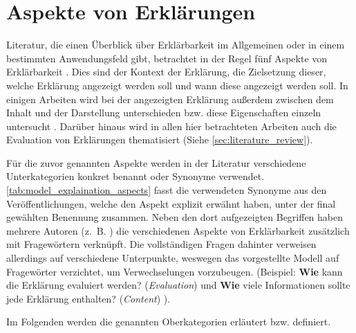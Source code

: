 \section{Aspekte von Erklärungen}
\label{sec:model_explanation_aspects}

Literatur, die einen Überblick über Erklärbarkeit im Allgemeinen oder in einem bestimmten Anwendungsfeld gibt, betrachtet in der Regel fünf Aspekte von Erklärbarkeit \cite{rosenfeld_explainability_2019, nunes_systematic_2017,chazette_knowledge_nodate}. Dies sind der Kontext der Erklärung, die Zielsetzung dieser, welche Erklärung angezeigt werden soll und wann diese angezeigt werden soll. In einigen Arbeiten wird bei der angezeigten Erklärung außerdem zwischen dem Inhalt und der Darstellung unterschieden bzw. diese Eigenschaften einzeln untersucht \cite{nunes_systematic_2017,abdulrahman_belief-based_2019}. Darüber hinaus wird in allen hier betrachteten Arbeiten auch die Evaluation von Erklärungen thematisiert (Siehe \autoref{sec:literature_review}).

Für die zuvor genannten Aspekte werden in der Literatur verschiedene Unterkategorien konkret benannt oder Synonyme verwendet. \autoref{tab:model_explaination_aspects} fasst die verwendeten Synonyme aus den Veröffentlichungen, welche den Aspekt explizit erwähnt haben, unter der final gewählten Benennung zusammen. Neben den dort aufgezeigten Begriffen haben mehrere Autoren (z.~B. \cite{rosenfeld_explainability_2019, chazette2020explainability}) die verschiedenen Aspekte von Erklärbarkeit zusätzlich mit Fragewörtern verknüpft. Die vollständigen Fragen dahinter verweisen allerdings auf verschiedene Unterpunkte, weswegen das vorgestellte Modell auf Fragewörter verzichtet, um Verwechselungen vorzubeugen. (Beispiel: \glqq \textbf{Wie} kann die Erklärung evaluiert werden?\grqq{} (\textit{Evaluation}) \cite[vgl.][]{rosenfeld_explainability_2019} und \glqq \textbf{Wie} viele Informationen sollte jede Erklärung enthalten?\grqq{} (\textit{Content}) \cite[vgl.][]{kouki_user_2017}).

\bigskip

Im Folgenden werden die genannten Oberkategorien erläutert bzw. definiert.

